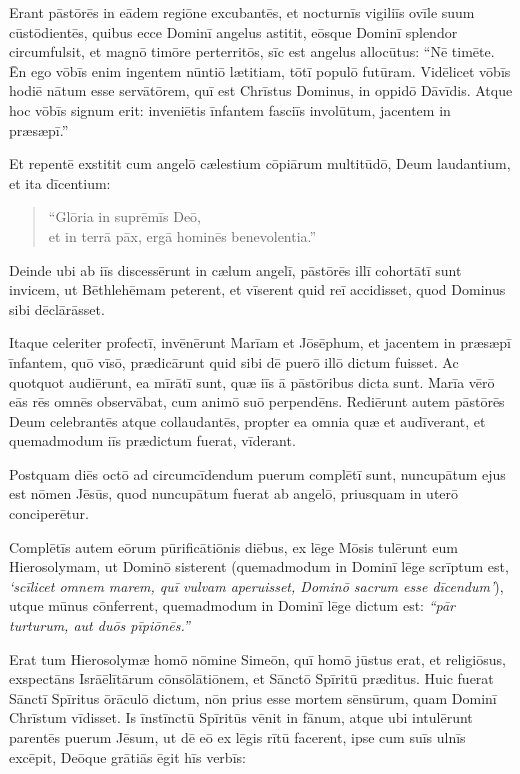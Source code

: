 \Versus Erant pāstōrēs in eādem regiōne excubantēs, et nocturnīs vigiliīs ovīle suum cūstō\-dientēs,
\Versus quibus ecce Dominī angelus astitit, eōsque Dominī splendor circumfulsit, et magnō timōre perterritōs,
\Versus sīc est angelus allocūtus: ``Nē timēte. Ēn ego vōbīs enim ingentem nūntiō lætitiam, tōtī populō futūram.
\Versus Vidēlicet vōbīs hodiē nātum esse servātōrem, quī est Chrīstus Dominus, in oppidō Dāvīdis.
\Versus Atque hoc vōbīs signum erit: inveniētis īnfantem fasciīs involūtum, jacentem in præsæpī.''

\Versus Et repentē exstitit cum angelō cælestium cōpiārum multitūdō, Deum laudantium, et ita dīcentium:

\begin{verse}
\begin{patverse*}
\Versus ``Glōria in suprēmīs Deō,\\
et in terrā pāx, ergā hominēs benevolentia.''
\end{patverse*}
\end{verse}

\Versus Deinde ubi ab iīs discessērunt in cælum angelī, pāstōrēs illī cohortātī sunt invicem, ut Bēthlehēmam peterent, et vīserent quid reī accidisset, quod Dominus sibi dēclārāsset.

\Versus Itaque celeriter profectī, invēnērunt Marīam et Jōsēphum, et jacentem in præsæpī īnfantem,
\Versus quō vīsō, prædicārunt quid sibi dē puerō illō dictum fuisset.
\Versus Ac quotquot audiērunt, ea mīrātī sunt, quæ iīs ā pāstōribus dicta sunt.
\Versus Marīa vērō eās rēs omnēs observābat, cum animō suō perpendēns.
\Versus Rediērunt autem pāstōrēs Deum celebrantēs atque collaudantēs, propter ea omnia quæ et audīverant, et quemadmodum iīs prædictum fuerat, vīderant.

\Versus Postquam diēs octō ad circumcīdendum puerum complētī sunt, nuncupātum ejus est nōmen Jēsūs, quod nuncupātum fuerat ab angelō, priusquam in uterō conciperētur.

\Versus Complētīs autem eōrum pūrificātiōnis diēbus, ex lēge Mōsis tulērunt eum Hierosolymam, ut Dominō sisterent
\Versus (quemadmodum in Dominī lēge scrīptum est, \emph{`scīlicet omnem marem, quī vulvam aperuisset, Dominō sacrum esse dīcendum'}),
\Versus utque mūnus cōnferrent, quemadmodum in Dominī lēge dictum est: \emph{``pār turturum, aut duōs pīpiōnēs.''}

\Versus Erat tum Hierosolymæ homō nōmine Simeōn, quī homō jūstus erat, et religiōsus, exspectāns Isrāēlītārum cōnsōlātiōnem, et Sānctō Spīritū præditus.
\Versus Huic fuerat Sānctī Spīritus ōrāculō dictum, nōn prius esse mortem sēnsūrum, quam Dominī Chrīstum vīdisset.
\Versus Is īnstīnctū Spīritūs vēnit in fānum, atque ubi intulērunt parentēs puerum Jēsum, ut dē eō ex lēgis rītū facerent,
\Versus ipse cum suīs ulnīs excēpit, Deōque grātiās ēgit hīs verbīs:

